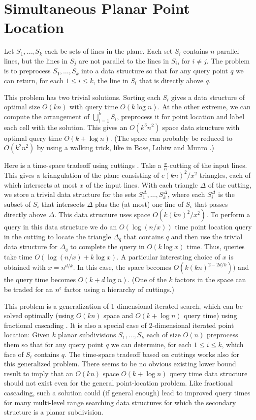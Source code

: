 \documentclass{article}
\newcommand{\problem}[1]{\section*{#1}}
\begin{document}
\problem{Simultaneous Planar Point Location}

Let $S_1,\ldots,S_k$ each be sets of lines in the plane.  Each set
$S_i$ contains $n$ parallel lines, but the lines in $S_j$ are not
parallel to the lines in $S_i$, for $i\neq j$.  The problem is to
preprocess $S_1,\ldots,S_k$ into a data structure so that for any
query point $q$ we can return, for each $1\le i\le k$, the line in
$S_i$ that is directly above $q$. 

This problem has two trivial solutions.  Sorting each $S_i$ gives a
data structure of optimal size $O(kn)$ with query time $O(k\log n)$.
At the other extreme, we can compute the arrangement of
$\bigcup_{i=1}^k S_i$, preprocess it for point location and label each
cell with the solution.  This gives an $O(k^3n^2)$ space data
structure with optimal query time $O(k + \log n)$.  (The space can
probably be reduced to $O(k^2n^2)$ by using a walking trick, like in
Bose, Lubiw and Munro \cite{blm02}.)


Here is a time-space tradeoff using cuttings \cite{m98}. Take a
$\frac{x}{n}$-cutting of the input lines.  This gives a triangulation
of the plane consisting of $c(kn)^2/x^2$ triangles, each of which
intersects at most $x$ of the input lines.  With each triangle
$\Delta$ of the cutting, we store a trivial data structure for the
sets $S_1^\Delta,\ldots,S_k^\Delta$, where each $S_i^\Delta$ is the
subset of $S_i$ that intersects $\Delta$ plus the (at most) one line
of $S_i$ that passes directly above $\Delta$.  This data structure
uses space $O(k(kn)^2/x^2)$.  To perform a query in this data
structure we do an $O(\log (n/x))$ time point location query in the
cutting to locate the triangle $\Delta_q$ that contains $q$ and then
use the trivial data structure for $\Delta_q$ to complete the query in
$O(k\log x)$ time.  Thus, queries take time $O(\log(n/x) + k\log x)$.
A particular interesting choice of $x$ is obtained with $x=n^{d/k}$.
In this case, the space becomes $O(k(kn)^{2-2d/k}))$ and the query
time becomes $O(k + d\log n)$.  (One of the $k$ factors in the space
can be traded for an $n^\epsilon$ factor using a hierarchy of
cuttings.) 

This problem is a generalization of 1-dimensional iterated search,
which can be solved optimally (using $O(kn)$ space and $O(k+\log n)$
query time) using fractional cascading \cite{cg86}.  It is also a
special case of 2-dimensional iterated point location: Given $k$
planar subdivisions $S_1,\ldots,S_k$ each of size $O(n)$ preprocess
them so that for any query point $q$ we can determine, for each $1\le
i\le k$, which face of $S_i$ contains $q$. The time-space tradeoff
based on cuttings works also for this generalized problem.  There
seems to be no obvious existing lower bound result to imply that an
$O(kn)$ space $O(k+\log n)$ query time data structure should not exist
even for the general point-location problem.  Like fractional
cascading, such a solution could (if general enough) lead to improved
query times for many multi-level range searching data structures for
which the secondary structure is a planar subdivision.
\end{document}
